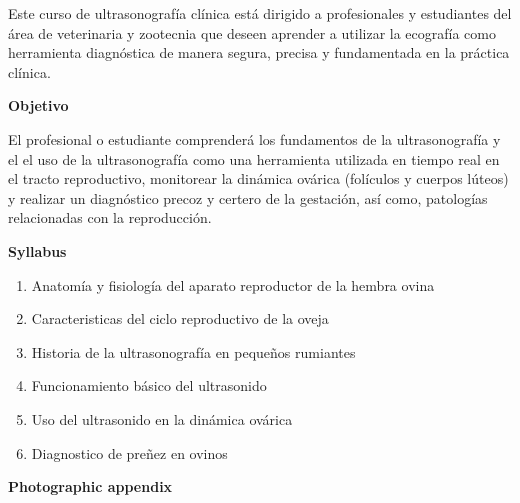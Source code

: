\vspace{-.6cm}
\justify
Este curso de ultrasonografía clínica está dirigido a profesionales y estudiantes del área de veterinaria y zootecnia que deseen aprender a utilizar la ecografía como herramienta diagnóstica de manera segura, precisa y fundamentada en la práctica clínica.

\begin{center}
	\vspace{-.32cm}
	\textbf{Objetivo}
	\vspace{-.32cm}
\end{center}
\justify
El profesional o estudiante comprenderá los fundamentos de la ultrasonografía y el el uso de la ultrasonografía como una herramienta utilizada en tiempo real en el tracto reproductivo, monitorear la dinámica ovárica (folículos y cuerpos lúteos) y realizar un diagnóstico precoz y certero de la gestación, así como, patologías relacionadas con la reproducción.

\begin{center}
	\vspace{-.32cm}
	\textbf{Syllabus}
	\vspace{-.32cm}
\end{center}

\begin{enumerate}
	\setlength\itemsep{-4pt}
	\item Anatomía y fisiología del aparato reproductor de la hembra ovina
	\item Caracteristicas del ciclo reproductivo de la oveja
	\item Historia de la ultrasonografía en pequeños rumiantes
	\item Funcionamiento básico del ultrasonido
	\item Uso del ultrasonido en la dinámica ovárica
	\item Diagnostico de preñez en ovinos
\end{enumerate}

\begin{center}
	\vspace{-.32cm}
	\textbf{Photographic appendix}
	\vspace{-.32cm}
\end{center}

